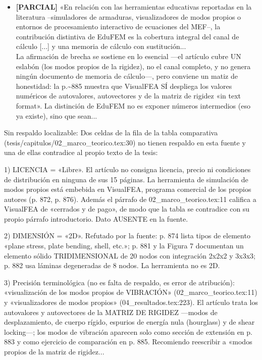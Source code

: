 \documentclass[11pt,a4paper]{article}
\newcommand{\campo}[1]{\textcolor{gris}{\footnotesize #1}}
\begin{document}
\begin{itemize}
\\ \campo{INCONSISTENCIA INTERNA DE LA TESIS. La tabla clasifica estos simuladores como de licencia «Libre», pero el propio párrafo de 02\_marco\_teorico.tex:11, cuatro renglones antes, dice de VisualFEA: «al ser cerrados y de pago no se los pudo examinar de primera mano». Y el artículo deja claro que la simulación de modos propios está EMBEBIDA en VisualFEA (p.\textasciitilde{}872 y p.\textasciitilde{}876: «The educational tool was implemented based on the development framework of VisualFEA»), es...}
\item \textbf{[PARCIAL]} «En relación con las herramientas educativas reportadas en la literatura --simuladores de armaduras, visualizadores de modos propios o entornos de procesamiento interactivo de ecuaciones del MEF--, la contribución distintiva de EduFEM es la cobertura integral del canal de cálculo [...] y una memoria de cálculo con sustitución...
\\ \campo{La afirmación de brecha se sostiene en lo esencial ---el artículo cubre UN eslabón (los modos propios de la rigidez), no el canal completo, y no genera ningún documento de memoria de cálculo---, pero conviene un matiz de honestidad: la p.\textasciitilde{}885 muestra que VisualFEA SÍ despliega los valores numéricos de autovalores, autovectores y de la matriz de rigidez «in text format». La distinción de EduFEM no es exponer números intermedios (eso ya existe), sino que sean...}
\end{itemize}
{\small\campo{Sin respaldo localizable:} Dos celdas de la fila de la tabla comparativa (tesis/capitulos/02\_marco\_teorico.tex:30) no tienen respaldo en esta fuente y una de ellas contradice al propio texto de la tesis:

1) LICENCIA = «Libre». El artículo no consigna licencia, precio ni condiciones de distribución en ninguna de sus 15 páginas. La herramienta de simulación de modos propios está embebida en VisualFEA, programa comercial de los propios autores (p. 872, p. 876). Además el párrafo de 02\_marco\_teorico.tex:11 califica a VisualFEA de «cerrados y de pago», de modo que la tabla se contradice con su propio párrafo introductorio. Dato AUSENTE en la fuente.

2) DIMENSIÓN = «2D». Refutado por la fuente: p. 874 lista tipos de elemento «plane stress, plate bending, shell, etc.»; p. 881 y la Figura 7 documentan un elemento sólido TRIDIMENSIONAL de 20 nodos con integración 2x2x2 y 3x3x3; p. 882 usa láminas degeneradas de 8 nodos. La herramienta no es 2D.

3) Precisión terminológica (no es falta de respaldo, es error de atribución): «visualización de los modos propios de VIBRACIÓN» (02\_marco\_teorico.tex:11) y «visualizadores de modos propios» (04\_resultados.tex:223). El artículo trata los autovalores y autovectores de la MATRIZ DE RIGIDEZ ---modos de desplazamiento, de cuerpo rígido, espurios de energía nula (hourglass) y de shear locking---; los modos de vibración aparecen solo como sección de extensión en p. 883 y como ejercicio de comparación en p. 885. Recomiendo reescribir a «modos propios de la matriz de rigidez...\par}
\end{document}
